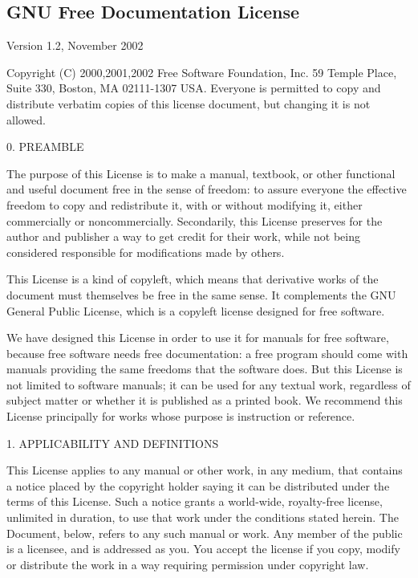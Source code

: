 \begin{noIndex}
\clearpage
\bigskip

\section*{GNU Free Documentation License}
Version 1.2, November 2002 


Copyright (C) 2000,2001,2002 Free Software Foundation, Inc. 59
Temple Place, Suite 330, Boston, MA 02111-1307 USA.  Everyone is
permitted to copy and distribute verbatim copies of this license
document, but changing it is not allowed.


0. PREAMBLE 


The purpose of this License is to make a manual, textbook, or other
functional and useful document {\textquotedbl}free{\textquotedbl} in
the sense of freedom: to assure everyone the effective freedom to copy
and redistribute it, with or without modifying it, either commercially
or noncommercially. Secondarily, this License preserves for the author
and publisher a way to get credit for their work, while not being
considered responsible for modifications made by others.

This License is a kind of {\textquotedbl}copyleft{\textquotedbl},
which means that derivative works of the document must themselves be
free in the same sense. It complements the GNU General Public License,
which is a copyleft license designed for free software.

We have designed this License in order to use it for manuals for free
software, because free software needs free documentation: a free
program should come with manuals providing the same freedoms that the
software does. But this License is not limited to software manuals; it
can be used for any textual work, regardless of subject matter or
whether it is published as a printed book. We recommend this License
principally for works whose purpose is instruction or reference.


1. APPLICABILITY AND DEFINITIONS 


This License applies to any manual or other work, in any medium, that
contains a notice placed by the copyright holder saying it can be
distributed under the terms of this License. Such a notice grants a
world-wide, royalty-free license, unlimited in duration, to use that
work under the conditions stated herein. The
{\textquotedbl}Document{\textquotedbl}, below, refers to any such
manual or work. Any member of the public is a licensee, and is
addressed as {\textquotedbl}you{\textquotedbl}. You accept the license
if you copy, modify or distribute the work in a way requiring
permission under copyright law.


\end{noIndex}
